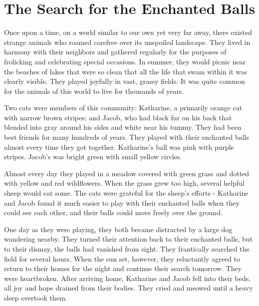 \chapter{The Search for the Enchanted Balls}
\setlength{\parindent}{2em}
\Large
{}\baselineskip




Once upon a time, on a world similar to our own yet very far away, there existed strange animals who roamed carefree over its unspoiled landscape. They lived in harmony with their neighbors and gathered regularly for the purposes of frolicking and celebrating special occasions. In summer, they would picnic near the beaches of lakes that were so clean that all the life that swam within it was clearly visible. They played joyfully in vast, grassy fields. It was quite common for the animals of this world to live for thousands of years.

Two cats were members of this community: Katharine, a primarily orange cat with narrow brown stripes; and Jacob, who had black fur on his back that blended into gray around his sides and white near his tummy. They had been best friends for many hundreds of years. They played with their enchanted balls almost every time they got together. Katharine's ball was pink with purple stripes. Jacob's was bright green with small yellow circles.

Almost every day they played in a meadow covered with green grass and dotted with yellow and red wildflowers. When the grass grew too high, several helpful sheep would eat some. The cats were grateful for the sheep’s efforts - Katharine and Jacob found it much easier to play with their enchanted balls when they could see each other, and their balls could move freely over the ground.

One day as they were playing, they both became distracted by a large dog wandering nearby. They turned their attention back to their enchanted balls, but to their dismay, the balls had vanished from sight. They frantically searched the field for several hours. When the sun set, however, they reluctantly agreed to return to their homes for the night and continue their search tomorrow. They were heartbroken. After arriving home, Katharine and Jacob fell into their beds, all joy and hope drained from their bodies. They cried and meowed until a heavy sleep overtook them.

